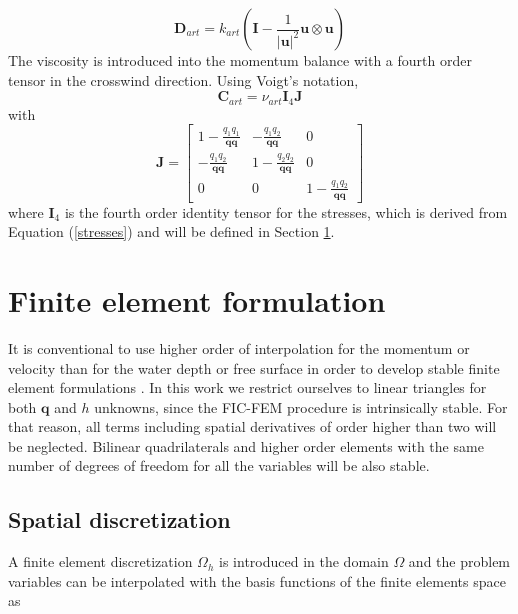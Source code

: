 \documentclass[a4paper,12pt]{elsarticle}
\newcommand{\abs}[1]{\lvert#1\rvert}
\begin{document}
\begin{equation}
\mathbf{D}_{art} = k_{art}
\left( \mathbf{I} - \frac{1}{\abs{\mathbf{u}}^2} \mathbf{u} \otimes \mathbf{u} \right)
\end{equation}
The viscosity is introduced into the momentum balance with a fourth order tensor in the crosswind direction. Using Voigt's notation,
\begin{equation}
\mathbf{C}_{art} = \nu_{art} \mathbf{I}_4 \mathbf{J}
\end{equation}
with
\begin{equation}
\mathbf{J} = \left[\begin{matrix}
    1-\frac{q_1q_1}{\mathbf{q}\mathbf{q}} & -\frac{q_1q_2}{\mathbf{q}\mathbf{q}} & 0 \\
    -\frac{q_1q_2}{\mathbf{q}\mathbf{q}} & 1-\frac{q_2q_2}{\mathbf{q}\mathbf{q}} & 0 \\
    0 & 0 & 1-\frac{q_1q_2}{\mathbf{q}\mathbf{q}}
\end{matrix}\right]
\end{equation}
where $\mathbf{I}_4$ is the fourth order identity tensor for the stresses, which is derived from Equation (\ref{stresses}) and will be defined in Section \ref{sec:fem}.

\section{Finite element formulation} \label{sec:fem} 

It is conventional to use higher order of interpolation for the momentum or velocity than for the water depth or free surface in order to develop stable finite element formulations \cite{hood1974,heniche2000,bercovier1979}. In this work we restrict ourselves to linear triangles for both $\mathbf{q}$ and $h$ unknowns, since the FIC-FEM procedure is intrinsically stable. For that reason, all terms including spatial derivatives of order higher than two will be neglected. Bilinear quadrilaterals and higher order elements with the same number of degrees of freedom for all the variables will be also stable.

\subsection{Spatial discretization}

A finite element discretization $\Omega_h$ is introduced in the domain $\Omega$ and the problem variables can be interpolated with the basis functions of the finite elements space as
\end{document}
